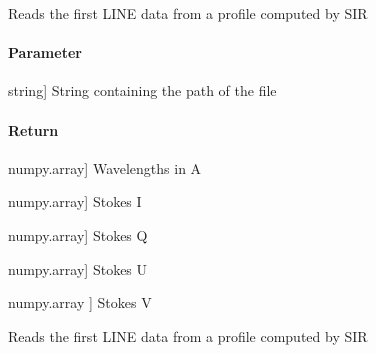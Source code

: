\documentclass[letterpaper,10pt,english]{sphinxmanual}
\begin{document}
\begin{fulllineitems}
\begin{fulllineitems}
\begin{description}
\end{description}

\end{fulllineitems}


\begin{fulllineitems}
\label{\detokenize{classes:profile_stk.Profile.__read_profile_sir}}
\pysigstartsignatures
{}
\pysigstopsignatures
\sphinxAtStartPar
Reads the first LINE data from a profile computed by SIR


\paragraph{Parameter}
\label{\detokenize{classes:id33}}\begin{description}
\sphinxlineitem{filename}{[}string{]}
\sphinxAtStartPar
String containing the path of the file

\end{description}


\paragraph{Return}
\label{\detokenize{classes:id34}}\begin{description}
\sphinxlineitem{ll}{[}numpy.array{]}
\sphinxAtStartPar
Wavelengths in A

\sphinxlineitem{I}{[}numpy.array{]}
\sphinxAtStartPar
Stokes I

\sphinxlineitem{Q}{[}numpy.array{]}
\sphinxAtStartPar
Stokes Q

\sphinxlineitem{U}{[}numpy.array{]}
\sphinxAtStartPar
Stokes U

\sphinxlineitem{V}{[}numpy.array {]}
\sphinxAtStartPar
Stokes V

\end{description}

\end{fulllineitems}


\begin{fulllineitems}
\label{\detokenize{classes:profile_stk.Profile.__read_profile_sir_mc}}
\pysigstartsignatures
{}
\pysigstopsignatures
\sphinxAtStartPar
Reads the first LINE data from a profile computed by SIR



\end{fulllineitems}
\end{fulllineitems}
\end{document}
